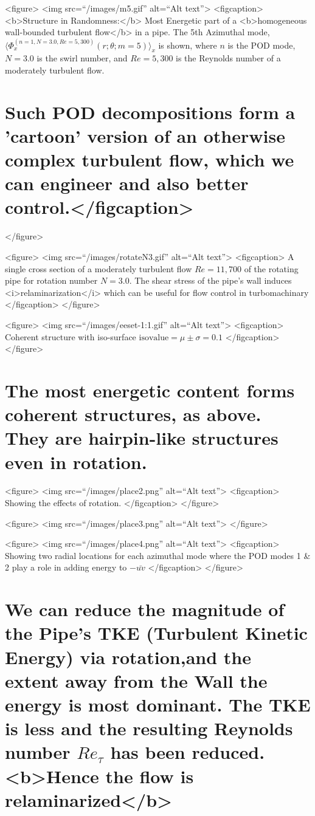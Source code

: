 \documentclass[11pt]{article}
\begin{document}
<figure>
  <img src=``/images/m5.gif'' alt=``Alt text''>
  <figcaption> <b>Structure in Randomness:</b> Most Energetic part of a <b>homogeneous wall-bounded turbulent flow</b> in a pipe. The 5th Azimuthal mode, \(\langle\Phi^{(n=1,N=3.0,Re=5,300)}_x(r;\theta;m=5)\rangle_x\) is shown, where \(n\) is the POD mode, \(N=3.0\) is the swirl number, and \(Re=5,300\) is the Reynolds number of a moderately turbulent flow. 

\section{Such POD decompositions form a 'cartoon' version of an otherwise complex turbulent flow, which we can engineer and also better control.</figcaption>}
\label{sec:org47ad115}
</figure>



<figure>
  <img src=``/images/rotateN3.gif'' alt=``Alt text''>
  <figcaption>
  A single cross section of a moderately turbulent flow \(Re=11,700\) of the rotating pipe for rotation number \(N=3.0\). The shear stress of the pipe's wall induces <i>relaminarization</i> which can be useful for flow control in turbomachinary
</figcaption>
</figure>



<figure>
  <img src=``/images/eeset-1:1.gif'' alt=``Alt text''>
  <figcaption> Coherent structure with iso-surface \(\text{isovalue} = \mu \pm \sigma = 0.1\)
</figcaption>
</figure>

\section{The most energetic content forms coherent structures, as above. They are hairpin-like structures even in rotation.}
\label{sec:orgb1cca15}

<figure>
  <img src=``/images/place2.png'' alt=``Alt text''>
  <figcaption> Showing the effects of rotation.
</figcaption>
</figure>

<figure>
  <img src=``/images/place3.png'' alt=``Alt text''>
</figure>

<figure>
  <img src=``/images/place4.png'' alt=``Alt text''>
  <figcaption> Showing two radial locations for each azimuthal mode where the POD modes 1 \& 2 play a role in adding energy to \(-\bar{uv}\)
</figcaption>
</figure>

\section{We can reduce the magnitude of the Pipe's TKE (Turbulent Kinetic Energy) via rotation,and the extent away from the Wall the energy is most dominant. The TKE is less and the resulting Reynolds number \(Re_\tau\) has been reduced. <b>Hence the flow is relaminarized</b>}
\label{sec:orgb9b67a9}
\end{document}
